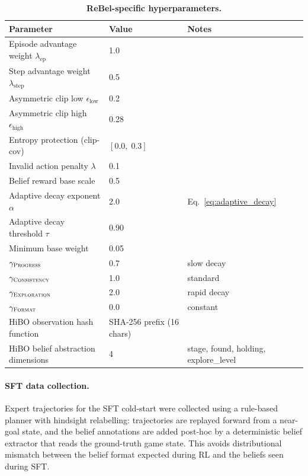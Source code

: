 \begin{table}[h]
  \centering
  \caption{\textbf{ReBel-specific hyperparameters.}}
  \label{tab:config_rebel}
  \vspace{4pt}
  \small
  \renewcommand{\arraystretch}{1.2}
  \begin{tabular}{@{}lll@{}}
    \toprule
    \textbf{Parameter} & \textbf{Value} & \textbf{Notes} \\
    \midrule
    Episode advantage weight $\lambda_{\text{ep}}$ & 1.0 & \\
    Step advantage weight $\lambda_{\text{step}}$ & 0.5 & \\
    Asymmetric clip low $\epsilon_{\text{low}}$ & 0.2 & \\
    Asymmetric clip high $\epsilon_{\text{high}}$ & 0.28 & \\
    Entropy protection (clip-cov)       & $[0.0,\; 0.3]$ & \\
    Invalid action penalty $\lambda$    & 0.1 & \\
    Belief reward base scale            & 0.5 & \\
    Adaptive decay exponent $\alpha$    & 2.0 & Eq.~\ref{eq:adaptive_decay} \\
    Adaptive decay threshold $\tau$     & 0.90 & \\
    Minimum base weight                 & 0.05 & \\
    $\gamma_{\textsc{Progress}}$        & 0.7 & slow decay \\
    $\gamma_{\textsc{Consistency}}$     & 1.0 & standard \\
    $\gamma_{\textsc{Exploration}}$     & 2.0 & rapid decay \\
    $\gamma_{\textsc{Format}}$          & 0.0 & constant \\
    HiBO observation hash function      & SHA-256 prefix (16 chars) & \\
    HiBO belief abstraction dimensions  & 4 & stage, found, holding, explore\_level \\
    \bottomrule
  \end{tabular}
\end{table}

\paragraph{SFT data collection.}
Expert trajectories for the SFT cold-start were collected using a rule-based planner
with hindsight relabelling: trajectories are replayed forward from a near-goal state,
and the belief annotations are added post-hoc by a deterministic belief extractor
that reads the ground-truth game state.
This avoids distributional mismatch between the belief format expected during RL
and the beliefs seen during SFT.
